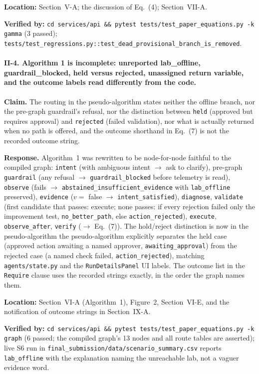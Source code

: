 \documentclass[11pt,a4paper]{article}
\begin{document}
\textbf{Location:} Section~V-A; the discussion of Eq.~(4); Section~VII-A.

\textbf{Verified by:}
\texttt{cd services/api \&\& pytest tests/test\_paper\_equations.py -k gamma}
(3 passed); \texttt{tests/test\_regressions.py::test\_dead\_provisional\_branch\_is\_removed}.

\paragraph{II-4. Algorithm 1 is incomplete: unreported lab\_offline,
guardrail\_blocked, held versus rejected, unassigned return variable, and the
outcome labels read differently from the code.}

\textbf{Claim.} The routing in the pseudo-algorithm states neither the
offline branch, nor the pre-graph guardrail's refusal, nor the distinction
between \texttt{held} (approved but requires approval) and \texttt{rejected}
(failed validation), nor what is actually returned when no path is offered,
and the outcome shorthand in Eq.~(7) is not the recorded outcome string.

\textbf{Response.} Algorithm~1 was rewritten to be node-for-node faithful to
the compiled graph: \texttt{intent} (with ambiguous intent $\to$ ask to clarify),
pre-graph \texttt{guardrail} (any refusal $\to$ \texttt{guardrail\_blocked} before
telemetry is read), \texttt{observe} (fails $\to$ \texttt{abstained\_insufficient\_evidence}
with \texttt{lab\_offline} preserved), \texttt{evidence} ($v = $ false $\to$
\texttt{intent\_satisfied}), \texttt{diagnose}, \texttt{validate} (first candidate
that passes: execute; none passes: if every rejection failed only the
improvement test, \texttt{no\_better\_path}, else \texttt{action\_rejected}),
\texttt{execute}, \texttt{observe\_after}, \texttt{verify}
($\to$ Eq.~(7)). The hold/reject distinction is now in the pseudo-algorithm
the pseudo-algorithm explicitly separates the held case
(approved action awaiting a named approver, \texttt{awaiting\_approval})
from the rejected case (a named check failed, \texttt{action\_rejected}),
matching \texttt{agents/state.py} and the \texttt{RunDetailsPanel} UI labels. The outcome list in the \texttt{Require} clause uses
the recorded strings exactly, in the order the graph names them.

\textbf{Location:} Section~VI-A (Algorithm~1), Figure~2, Section~VI-E, and the
notification of outcome strings in Section~IX-A.

\textbf{Verified by:}
\texttt{cd services/api \&\& pytest tests/test\_paper\_equations.py -k graph}
(6 passed; the compiled graph's 13 nodes and all route tables are asserted);
live S6 run in \texttt{final\_submission/data/scenario\_summary.csv}
reports \texttt{lab\_offline} with the explanation naming the unreachable lab,
not a vaguer evidence word.
\end{document}
